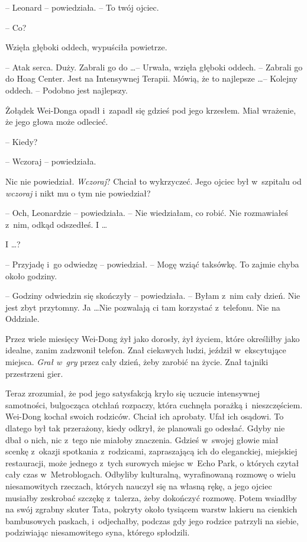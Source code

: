 \documentclass[oneside,polish,11pt,rmheadings]{mwbk}
\begin{document}
-- Leonard -- powiedziała. -- To twój ojciec.

-- Co? 

Wzięła głęboki oddech, wypuściła powietrze. 

-- Atak serca. Duży. Zabrali go do \ldots  -- Urwała, wzięła głęboki oddech. -- Zabrali go do Hoag Center. Jest na Intensywnej Terapii. Mówią, że to najlepsze \ldots  -- Kolejny oddech. -- Podobno jest najlepszy.

Żołądek Wei-Donga opadł i~zapadł się gdzieś pod jego krzesłem. Miał wrażenie, że jego głowa może odlecieć. 

-- Kiedy? 

-- Wczoraj -- powiedziała.

Nic nie powiedział. \textit{Wczoraj}? Chciał to wykrzyczeć. Jego ojciec był w~szpitalu od \textit{wczoraj }i nikt mu o tym nie powiedział?

-- Och, Leonardzie -- powiedziała. -- Nie wiedziałam, co robić. Nie rozmawiałeś z~nim, odkąd odszedłeś. I \ldots 

I \ldots ? 

-- Przyjadę i~go odwiedzę -- powiedział. -- Mogę wziąć taksówkę. To zajmie chyba około godziny.

-- Godziny odwiedzin się skończyły -- powiedziała. -- Byłam z~nim cały dzień. Nie jest zbyt przytomny. Ja \ldots  Nie pozwalają ci tam korzystać z~telefonu. Nie na Oddziale.

Przez wiele miesięcy Wei-Dong żył jako dorosły, żył życiem, które określiłby jako idealne, zanim zadzwonił telefon. Znał ciekawych ludzi, jeździł w~ekscytujące miejsca. \textit{Grał w~gry }przez cały dzień, żeby zarobić na życie. Znał tajniki przestrzeni gier.

Teraz zrozumiał, że pod jego satysfakcją kryło się uczucie intensywnej samotności, bulgocząca otchłań rozpaczy, która cuchnęła porażką i~nieszczęściem. Wei-Dong kochał swoich rodziców. Chciał ich aprobaty. Ufał ich osądowi. To dlatego był tak przerażony, kiedy odkrył, że planowali go odesłać. Gdyby nie dbał o nich, nic z~tego nie miałoby znaczenia. Gdzieś w~swojej głowie miał scenkę z~okazji spotkania z~rodzicami, zapraszającą ich do eleganckiej, miejskiej restauracji, może jednego z~tych surowych miejsc w~Echo Park, o których czytał cały czas w~Metroblogach. Odbyliby kulturalną, wyrafinowaną rozmowę o wielu niesamowitych rzeczach, których nauczył się na własną rękę, a jego ojciec musiałby zeskrobać szczękę z~talerza, żeby dokończyć rozmowę. Potem wsiadłby na swój zgrabny skuter Tata, pokryty około tysiącem warstw lakieru na cienkich bambusowych paskach, i~odjechałby, podczas gdy jego rodzice patrzyli na siebie, podziwiając niesamowitego syna, którego spłodzili.
\end{document}
